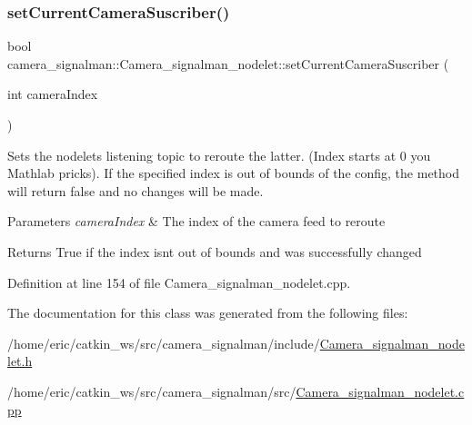 \subsubsection{\texorpdfstring{setCurrentCameraSuscriber()}{setCurrentCameraSuscriber()}\hspace{0.1cm}{\footnotesize\ttfamily [2/2]}}
{\footnotesize\ttfamily bool camera\+\_\+signalman\+::\+Camera\+\_\+signalman\+\_\+nodelet\+::set\+Current\+Camera\+Suscriber (\begin{DoxyParamCaption}\item[{int}]{camera\+Index }\end{DoxyParamCaption})}

Sets the nodelet\textquotesingle{}s listening topic to reroute the latter. (Index starts at 0 you Mathlab pricks). If the specified index is out of bounds of the config, the method will return false and no changes will be made. 
\begin{DoxyParams}{Parameters}
{\em camera\+Index} & The index of the camera feed to reroute \\
\hline
\end{DoxyParams}
\begin{DoxyReturn}{Returns}
True if the index isn\textquotesingle{}t out of bounds and was successfully changed 
\end{DoxyReturn}


Definition at line 154 of file Camera\+\_\+signalman\+\_\+nodelet.\+cpp.



The documentation for this class was generated from the following files\+:\begin{DoxyCompactItemize}
\item 
/home/eric/catkin\+\_\+ws/src/camera\+\_\+signalman/include/\mbox{\hyperlink{Camera__signalman__nodelet_8h}{Camera\+\_\+signalman\+\_\+nodelet.\+h}}\item 
/home/eric/catkin\+\_\+ws/src/camera\+\_\+signalman/src/\mbox{\hyperlink{Camera__signalman__nodelet_8cpp}{Camera\+\_\+signalman\+\_\+nodelet.\+cpp}}\end{DoxyCompactItemize}
